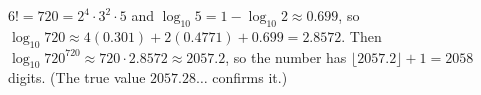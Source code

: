 $6!=720=2^4\cdot3^2\cdot5$ and $\log_{10}5=1-\log_{10}2\approx0.699$, so $\log_{10}720\approx4(0.301)+2(0.4771)+0.699=2.8572$. Then $\log_{10}720^{720}\approx720\cdot2.8572\approx2057.2$, so the number has $\lfloor2057.2\rfloor+1=\boxed{2058}$ digits. (The true value $2057.28\ldots$ confirms it.)

